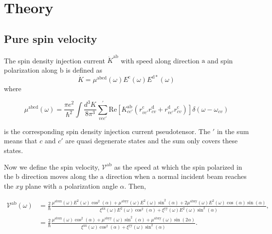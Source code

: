 \documentclass[prb,11pt,tightenlines,twocolumn,aps]{revtex4-1}
\begin{document}
\section{Theory} %
\label{sec:theory}


\subsection{Pure spin velocity} %
\label{sec:theory-pure_spin_current}

The spin density injection current $\dot{K}^{\mathrm{ab}}$ with speed along
direction $\mathrm{a}$ and spin polarization along $\mathrm{b}$ is defined as
\begin{equation}
\dot{K} = \mu^{\mathrm{abcd}}(\omega)
E^{\mathrm{c}}(\omega) E^{\mathrm{d*}}(\omega)
\label{eq:dotk}
\end{equation}
where
\begin{widetext}
\begin{equation}
\mu^{\mathrm{abcd}} (\omega) =
\frac{\pi e^{2}}{\hbar^{2}} \int 
\frac{d^{3}K}{8 \pi^{3}} \sum_{vcc'}^{'}
\mathrm{Re} \left[ K^{\mathrm{ab}}_{cc'} ( 
r^{\mathrm{c}}_{vc'} 
r^{\mathrm{d}}_{cv } +
r^{\mathrm{d}}_{vc'} 
r^{\mathrm{c}}_{cv } ) \right]
\delta(\omega-\omega_{cv})
\label{eq:mu}
\end{equation}
\end{widetext}
is the corresponding spin density injection current pseudotensor. The $'$
in the sum means that $c$ and $c'$ are quasi degenerate states and the sum only
covers these states.

Now we define the spin velocity, $\mathcal{V}^{\mathrm{ab}}$ as the speed at
which the spin polarized in the $\mathrm{b}$   direction moves along the
$\mathrm{a}$ direction when a normal incident beam reaches the $xy$ plane with a
polarization angle $\alpha$. Then,
\begin{widetext}
\begin{align}
\mathcal{V}^{\mathrm{ab}} (\omega) 
&= \frac{2}{\hbar}
\frac{\mu^{\mathrm{abxx}}(\omega)
E^{2}(\omega)\cos^{2}(\alpha) + 
\mu^{\mathrm{abyy}}(\omega)
E^{2}(\omega)\sin^{2}(\alpha) + 
2\mu^{\mathrm{abxy}}(\omega)
E^{2}(\omega)\cos(\alpha)\sin(\alpha)}
{\xi^{\mathrm{xx}}(\omega)
E^{2}(\omega)\cos^{2}(\alpha) + 
\xi^{\mathrm{yy}}(\omega)
E^{2}(\omega)\sin^{2}(\alpha)},
\nonumber \\
&= \frac{2}{\hbar}
\frac{\mu^{\mathrm{abxx}}(\omega)\cos^{2}(\alpha) + 
\mu^{\mathrm{abyy}}(\omega)\sin^{2}(\alpha) + 
\mu^{\mathrm{abxy}}(\omega)\sin(2\alpha)}
{\xi^{\mathrm{xx}}(\omega)\cos^{2}(\alpha) + 
\xi^{\mathrm{yy}}(\omega)\sin^{2}(\alpha)}.
\label{eq:vab}
\end{align}
\end{widetext}
\end{document}
